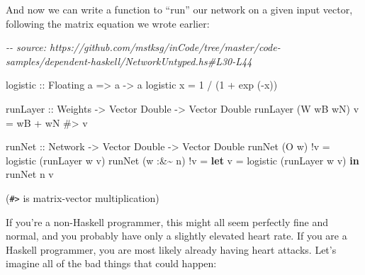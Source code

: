 \documentclass[]{article}
\newenvironment{Shaded}{}{}
\newcommand{\CommentTok}[1]{\textcolor[rgb]{0.38,0.63,0.69}{\textit{#1}}}
\newcommand{\DataTypeTok}[1]{\textcolor[rgb]{0.56,0.13,0.00}{#1}}
\newcommand{\DecValTok}[1]{\textcolor[rgb]{0.25,0.63,0.44}{#1}}
\newcommand{\FunctionTok}[1]{\textcolor[rgb]{0.02,0.16,0.49}{#1}}
\newcommand{\KeywordTok}[1]{\textcolor[rgb]{0.00,0.44,0.13}{\textbf{#1}}}
\newcommand{\NormalTok}[1]{#1}
\newcommand{\OperatorTok}[1]{\textcolor[rgb]{0.40,0.40,0.40}{#1}}
\newcommand{\OtherTok}[1]{\textcolor[rgb]{0.00,0.44,0.13}{#1}}
\begin{document}
And now we can write a function to ``run'' our network on a given input vector,
following the matrix equation we wrote earlier:

\begin{Shaded}
\begin{Highlighting}[]
\CommentTok{{-}{-} source: https://github.com/mstksg/inCode/tree/master/code{-}samples/dependent{-}haskell/NetworkUntyped.hs\#L30{-}L44}

\OtherTok{logistic ::} \DataTypeTok{Floating}\NormalTok{ a }\OtherTok{=\textgreater{}}\NormalTok{ a }\OtherTok{{-}\textgreater{}}\NormalTok{ a}
\NormalTok{logistic x }\OtherTok{=} \DecValTok{1} \OperatorTok{/}\NormalTok{ (}\DecValTok{1} \OperatorTok{+} \FunctionTok{exp}\NormalTok{ (}\OperatorTok{{-}}\NormalTok{x))}

\OtherTok{runLayer ::} \DataTypeTok{Weights} \OtherTok{{-}\textgreater{}} \DataTypeTok{Vector} \DataTypeTok{Double} \OtherTok{{-}\textgreater{}} \DataTypeTok{Vector} \DataTypeTok{Double}
\NormalTok{runLayer (}\DataTypeTok{W}\NormalTok{ wB wN) v }\OtherTok{=}\NormalTok{ wB }\OperatorTok{+}\NormalTok{ wN }\OperatorTok{\#\textgreater{}}\NormalTok{ v}

\OtherTok{runNet ::} \DataTypeTok{Network} \OtherTok{{-}\textgreater{}} \DataTypeTok{Vector} \DataTypeTok{Double} \OtherTok{{-}\textgreater{}} \DataTypeTok{Vector} \DataTypeTok{Double}
\NormalTok{runNet (}\DataTypeTok{O}\NormalTok{ w)      }\OperatorTok{!}\NormalTok{v }\OtherTok{=}\NormalTok{ logistic (runLayer w v)}
\NormalTok{runNet (w }\OperatorTok{:\&\textasciitilde{}}\NormalTok{ n\textquotesingle{}) }\OperatorTok{!}\NormalTok{v }\OtherTok{=} \KeywordTok{let}\NormalTok{ v\textquotesingle{} }\OtherTok{=}\NormalTok{ logistic (runLayer w v)}
                       \KeywordTok{in}\NormalTok{  runNet n\textquotesingle{} v\textquotesingle{}}
\end{Highlighting}
\end{Shaded}

(\texttt{\#\textgreater{}} is matrix-vector multiplication)

If you're a non-Haskell programmer, this might all seem perfectly fine and
normal, and you probably have only a slightly elevated heart rate. If you are a
Haskell programmer, you are most likely already having heart attacks. Let's
imagine all of the bad things that could happen:
\end{document}
